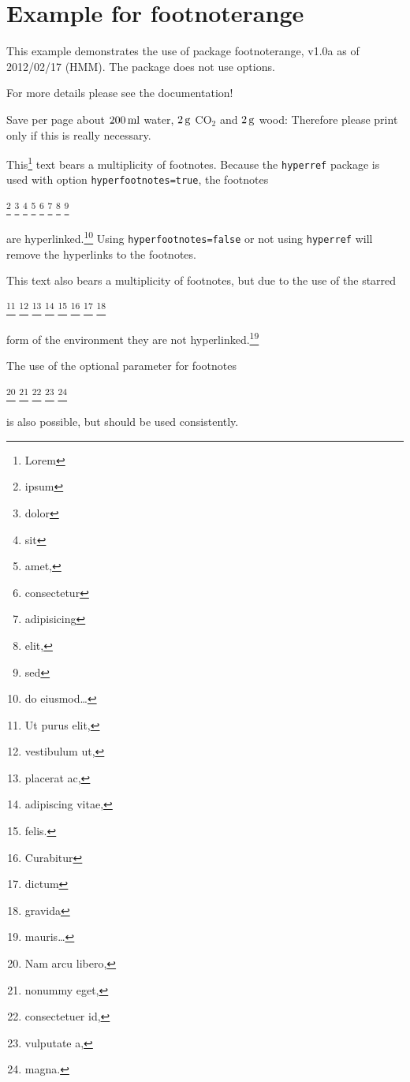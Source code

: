 \documentclass[british]{article}[2007/10/19]%
\gdef\unit#1{\mathord{\thinspace\mathrm{#1}}}%
\begin{document}
\section*{Example for footnoterange}

This example demonstrates the use of package\newline
\textsf{footnoterange}, v1.0a as of 2012/02/17 (HMM).\newline
The package does not use options.\newline

\noindent For more details please see the documentation!\newline

\noindent Save per page about $200\unit{ml}$ water,
$2\unit{g}$ CO$_{2}$ and $2\unit{g}$ wood:\newline
Therefore please print only if this is really necessary.\newline

This\footnote{Lorem} text bears a multiplicity of footnotes.
Because the \texttt{hyperref} package is used with option
\texttt{hyperfootnotes=true}, the footnotes%
\begin{footnoterange}%
\footnote{ipsum}%
\footnote{dolor}%
\footnote{sit}%
\footnote{amet,}%
\footnote{consectetur}%
\footnote{adipisicing}%
\footnote{elit,}%
\footnote{sed}%
\end{footnoterange}%
 are hyperlinked.\footnote{do eiusmod\ldots} Using
\texttt{hyperfootnotes=false} or not using \texttt{hyperref}
will remove the hyperlinks to the footnotes.\newline

This text also bears a multiplicity of footnotes,
but due to the use of the starred%
\begin{footnoterange*}%
\footnote{Ut purus elit,}%
\footnote{vestibulum ut,}%
\footnote{placerat ac,}%
\footnote{adipiscing vitae,}%
\footnote{felis.}%
\footnote{Curabitur}%
\footnote{dictum}%
\footnote{gravida}%
\end{footnoterange*}%
 form of the environment they are not
hyperlinked.\footnote{mauris\ldots}\newline

The use of the optional parameter for footnotes%
\begin{footnoterange}%
\footnote[101]{Nam arcu libero,}%
\footnote[102]{nonummy eget,}%
\footnote[103]{consectetuer id,}%
\footnote[104]{vulputate a,}%
\footnote[105]{magna.}
\end{footnoterange}%
 is also possible, but should be used consistently.
\end{document}
